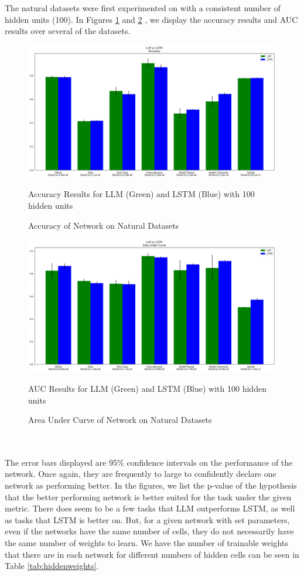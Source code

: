 The natural datasets were first experimented on with a consistent number of hidden units (100). In Figures \ref{fig:res} and \ref{fig:resAUC} , we display the accuracy results and AUC results over several of the datasets. 
\begin{figure}
    \centering
    \includegraphics[width=1.0\textwidth]{figures/Data_Results.png}
    \caption{Accuracy of Network on Natural Datasets}
    \label{fig:res}
    Accuracy Results for LLM (Green) and LSTM (Blue) with 100 hidden units
\end{figure}
\begin{figure}
    \centering
    \includegraphics[width=1.0\textwidth]{figures/Data_Results_AUC.png}
    \caption{Area Under Curve of Network on Natural Datasets}
    \label{fig:resAUC}
    AUC Results for LLM (Green) and LSTM (Blue) with 100 hidden units
\end{figure}
\\\\The error bars displayed are 95\% confidence intervals on the performance of the network. Once again, they are frequently to large to confidently declare one network as performing better. In the figures, we list the p-value of the hypothesis that the better performing network is better suited for the task under the given metric. There does seem to be a few tasks that LLM outperforms LSTM, as well as tasks that LSTM is better on. But, for a given network with set parameters, even if the networks have the same number of cells, they do not necessarily have the same number of weights to learn. We have the number of trainable weights that there are in each network for different numbers of hidden cells can be seen in Table \ref{tab:hiddenweights}.
  




